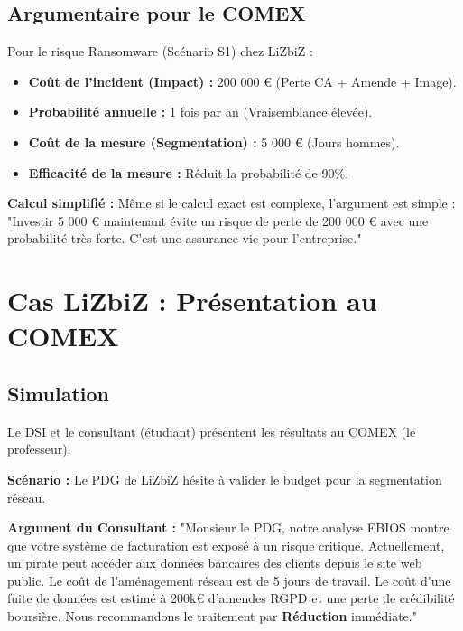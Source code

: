 \subsection{Argumentaire pour le COMEX}

Pour le risque Ransomware (Scénario S1) chez LiZbiZ :

\begin{itemize}
    \item \textbf{Coût de l'incident (Impact) :} 200 000 € (Perte CA + Amende + Image).
    \item \textbf{Probabilité annuelle :} 1 fois par an (Vraisemblance élevée).
    \item \textbf{Coût de la mesure (Segmentation) :} 5 000 € (Jours hommes).
    \item \textbf{Efficacité de la mesure :} Réduit la probabilité de 90\%.
\end{itemize}

\textbf{Calcul simplifié :}
Même si le calcul exact est complexe, l'argument est simple : "Investir 5 000 € maintenant évite un risque de perte de 200 000 € avec une probabilité très forte. C'est une assurance-vie pour l'entreprise."

\section{Cas LiZbiZ : Présentation au COMEX}

\subsection{Simulation}

Le DSI et le consultant (étudiant) présentent les résultats au COMEX (le professeur).

\begin{boxlizbiz}
\textbf{Scénario :} Le PDG de LiZbiZ hésite à valider le budget pour la segmentation réseau.

\textbf{Argument du Consultant :}
"Monsieur le PDG, notre analyse EBIOS montre que votre système de facturation est exposé à un risque critique. Actuellement, un pirate peut accéder aux données bancaires des clients depuis le site web public. Le coût de l'aménagement réseau est de 5 jours de travail. Le coût d'une fuite de données est estimé à 200k€ d'amendes RGPD et une perte de crédibilité boursière. Nous recommandons le traitement par \textbf{Réduction} immédiate."
\end{boxlizbiz}

